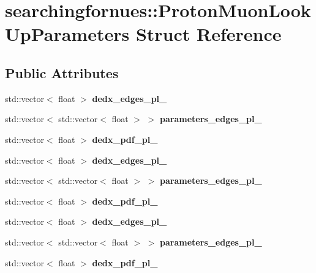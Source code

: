 \hypertarget{structsearchingfornues_1_1ProtonMuonLookUpParameters}{}\section{searchingfornues\+:\+:Proton\+Muon\+Look\+Up\+Parameters Struct Reference}
\label{structsearchingfornues_1_1ProtonMuonLookUpParameters}
\subsection*{Public Attributes}
\begin{DoxyCompactItemize}
\item 
std\+::vector$<$ float $>$ {\bfseries dedx\+\_\+edges\+\_\+pl\+\_}
\item 
std\+::vector$<$ std\+::vector$<$ float $>$ $>$ {\bfseries parameters\+\_\+edges\+\_\+pl\+\_}
\item 
std\+::vector$<$ float $>$ {\bfseries dedx\+\_\+pdf\+\_\+pl\+\_}\hypertarget{structsearchingfornues_1_1ProtonMuonLookUpParameters_ad60e1da766ad1003f3441f4da85cdf8b}{}\label{structsearchingfornues_1_1ProtonMuonLookUpParameters_ad60e1da766ad1003f3441f4da85cdf8b}

\item 
std\+::vector$<$ float $>$ {\bfseries dedx\+\_\+edges\+\_\+pl\+\_}
\item 
std\+::vector$<$ std\+::vector$<$ float $>$ $>$ {\bfseries parameters\+\_\+edges\+\_\+pl\+\_}
\item 
std\+::vector$<$ float $>$ {\bfseries dedx\+\_\+pdf\+\_\+pl\+\_}\hypertarget{structsearchingfornues_1_1ProtonMuonLookUpParameters_ae9e37b3f75ff3387bc36026947294569}{}\label{structsearchingfornues_1_1ProtonMuonLookUpParameters_ae9e37b3f75ff3387bc36026947294569}

\item 
std\+::vector$<$ float $>$ {\bfseries dedx\+\_\+edges\+\_\+pl\+\_}
\item 
std\+::vector$<$ std\+::vector$<$ float $>$ $>$ {\bfseries parameters\+\_\+edges\+\_\+pl\+\_}
\item 
std\+::vector$<$ float $>$ {\bfseries dedx\+\_\+pdf\+\_\+pl\+\_}\hypertarget{structsearchingfornues_1_1ProtonMuonLookUpParameters_ab11eb331e747aebf16329a5d3ee187ff}{}\label{structsearchingfornues_1_1ProtonMuonLookUpParameters_ab11eb331e747aebf16329a5d3ee187ff}

\end{DoxyCompactItemize}


